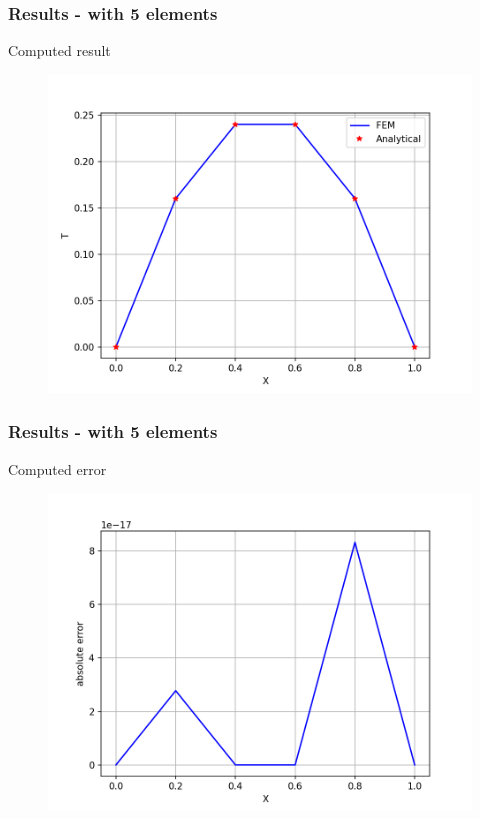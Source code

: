 
\begin{frame}
	\frametitle{Results - with 5 elements}
	Computed result
	\begin{figure}
		\includegraphics[scale=0.5]{supportingFiles/output_5.png}
	\end{figure}
\end{frame}

\begin{frame}
	\frametitle{Results - with 5 elements}
	Computed error
	\begin{figure}
		\includegraphics[scale=0.5]{supportingFiles/error_5.png}
	\end{figure}
\end{frame}

